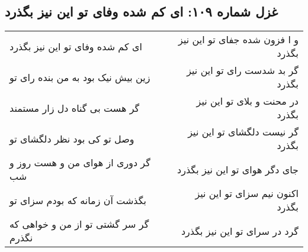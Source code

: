 \begin{center}
\section*{غزل شماره ۱۰۹: ای کم شده وفای تو این نیز بگذرد}
\label{sec:109}
\begin{longtable}{l p{0.5cm} r}
ای کم شده وفای تو این نیز بگذرد
&&
و ا فزون شده جفای تو این نیز بگذرد
\\
زین بیش نیک بود به من بنده رای تو
&&
گر بد شدست رای تو این نیز بگذرد
\\
گر هست بی گناه دل زار مستمند
&&
در محنت و بلای تو این نیز بگذرد
\\
وصل تو کی بود نظر دلگشای تو
&&
گر نیست دلگشای تو این نیز بگذرد
\\
گر دوری از هوای من و هست روز و شب
&&
جای دگر هوای تو این نیز بگذرد
\\
بگذشت آن زمانه که بودم سزای تو
&&
اکنون نیم سزای تو این نیز بگذرد
\\
گر سر گشتی تو از من و خواهی که نگذرم
&&
گرد در سرای تو این نیز بگذرد
\\
\end{longtable}
\end{center}
